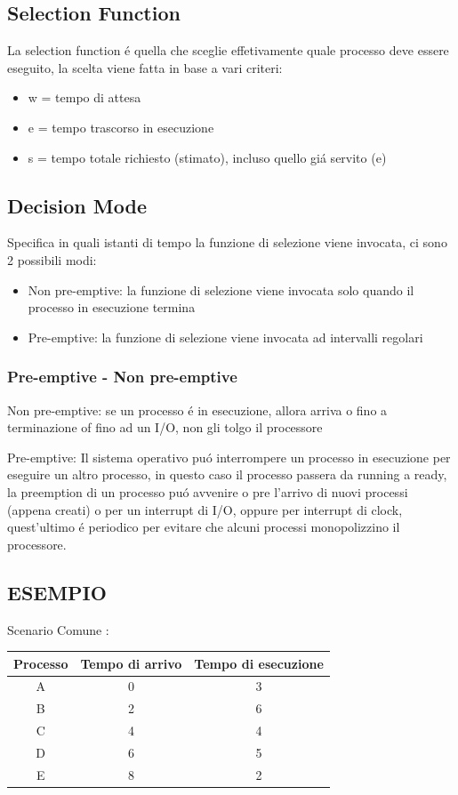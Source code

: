 \documentclass[11pt]{article}
\begin{document}
    \subsection{Selection Function}
    La selection function é quella che sceglie effetivamente quale processo deve essere eseguito,
    la scelta viene fatta in base a vari criteri:
    \begin{itemize}
        \item w = tempo di attesa
        \item e = tempo trascorso in esecuzione
        \item s = tempo totale richiesto (stimato), incluso quello giá servito (e)
    \end{itemize}
    \subsection{Decision Mode}
    Specifica in quali istanti di tempo la funzione di selezione viene invocata, ci sono 2 possibili modi:
    \begin{itemize}
        \item Non pre-emptive: la funzione di selezione viene invocata solo quando il processo in esecuzione termina
        \item Pre-emptive: la funzione di selezione viene invocata ad intervalli regolari
    \end{itemize}
    \subsubsection{Pre-emptive - Non pre-emptive}
    Non pre-emptive: se un processo é in esecuzione, allora arriva o fino a terminazione of fino ad un I/O, non gli tolgo il processore

    Pre-emptive: Il sistema operativo puó interrompere un processo in esecuzione per eseguire un altro processo, in questo caso il processo
    passera da running a ready, la preemption di un processo puó avvenire o pre l'arrivo di nuovi processi (appena creati) o per un interrupt di I/O,
    oppure per interrupt di clock, quest'ultimo é periodico per evitare che alcuni processi monopolizzino il processore.
    \subsection{ESEMPIO}
    Scenario Comune :
    \begin{table}[H]
        \raggedright
        \begin{tabular}{|c|c|c|}
            \hline
            \textbf{Processo} & \textbf{Tempo di arrivo} & \textbf{Tempo di esecuzione} \\
            \hline
            A & 0 & 3   \\
            \hline
            B & 2 & 6 \\
            \hline
            C & 4 & 4  \\
            \hline
            D & 6 & 5  \\
            \hline
            E & 8 & 2  \\
            \hline
        \end{tabular}
    \end{table}
\end{document}
